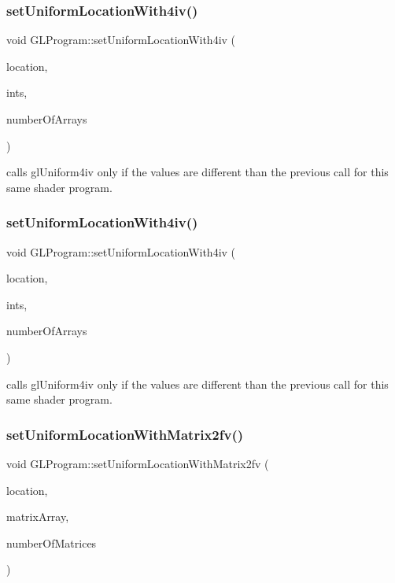 \subsubsection{\texorpdfstring{set\+Uniform\+Location\+With4iv()}{setUniformLocationWith4iv()}\hspace{0.1cm}{\footnotesize\ttfamily [1/2]}}
{\footnotesize\ttfamily void G\+L\+Program\+::set\+Uniform\+Location\+With4iv (\begin{DoxyParamCaption}\item[{G\+Lint}]{location,  }\item[{G\+Lint $\ast$}]{ints,  }\item[{unsigned int}]{number\+Of\+Arrays }\end{DoxyParamCaption})}

calls gl\+Uniform4iv only if the values are different than the previous call for this same shader program. \mbox{\label{classGLProgram_a8d7620f14405cd3fb99d83886ef15775}} 
\subsubsection{\texorpdfstring{set\+Uniform\+Location\+With4iv()}{setUniformLocationWith4iv()}\hspace{0.1cm}{\footnotesize\ttfamily [2/2]}}
{\footnotesize\ttfamily void G\+L\+Program\+::set\+Uniform\+Location\+With4iv (\begin{DoxyParamCaption}\item[{G\+Lint}]{location,  }\item[{G\+Lint $\ast$}]{ints,  }\item[{unsigned int}]{number\+Of\+Arrays }\end{DoxyParamCaption})}

calls gl\+Uniform4iv only if the values are different than the previous call for this same shader program. \mbox{\label{classGLProgram_a088e08492735e31f94ae29161f6e02d0}} 
\subsubsection{\texorpdfstring{set\+Uniform\+Location\+With\+Matrix2fv()}{setUniformLocationWithMatrix2fv()}\hspace{0.1cm}{\footnotesize\ttfamily [1/2]}}
{\footnotesize\ttfamily void G\+L\+Program\+::set\+Uniform\+Location\+With\+Matrix2fv (\begin{DoxyParamCaption}\item[{G\+Lint}]{location,  }\item[{const G\+Lfloat $\ast$}]{matrix\+Array,  }\item[{unsigned int}]{number\+Of\+Matrices }\end{DoxyParamCaption})}

